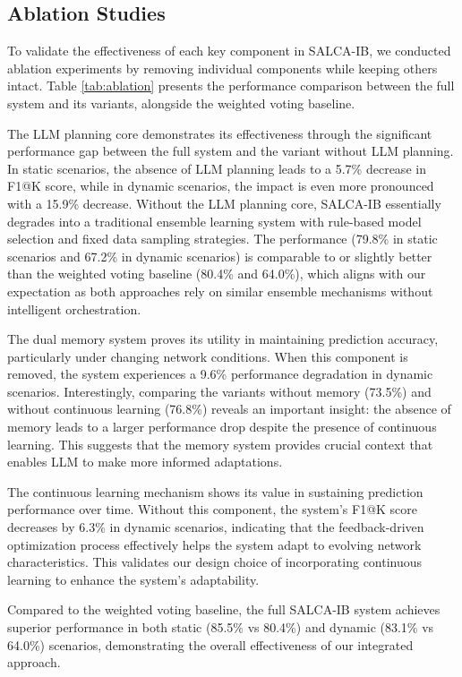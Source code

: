 \documentclass[conference]{IEEEtran}
\begin{document}
\subsection{Ablation Studies}
To validate the effectiveness of each key component in SALCA-IB, we conducted ablation experiments by removing individual components while keeping others intact. Table \ref{tab:ablation} presents the performance comparison between the full system and its variants, alongside the weighted voting baseline.

The LLM planning core demonstrates its effectiveness through the significant performance gap between the full system and the variant without LLM planning. In static scenarios, the absence of LLM planning leads to a 5.7\% decrease in F1@K score, while in dynamic scenarios, the impact is even more pronounced with a 15.9\% decrease. Without the LLM planning core, SALCA-IB essentially degrades into a traditional ensemble learning system with rule-based model selection and fixed data sampling strategies. The performance (79.8\% in static scenarios and 67.2\% in dynamic scenarios) is comparable to or slightly better than the weighted voting baseline (80.4\% and 64.0\%), which aligns with our expectation as both approaches rely on similar ensemble mechanisms without intelligent orchestration.

The dual memory system proves its utility in maintaining prediction accuracy, particularly under changing network conditions. When this component is removed, the system experiences a 9.6\% performance degradation in dynamic scenarios. Interestingly, comparing the variants without memory (73.5\%) and without continuous learning (76.8\%) reveals an important insight: the absence of memory leads to a larger performance drop despite the presence of continuous learning. This suggests that the memory system provides crucial context that enables LLM to make more informed adaptations.

The continuous learning mechanism shows its value in sustaining prediction performance over time. Without this component, the system's F1@K score decreases by 6.3\% in dynamic scenarios, indicating that the feedback-driven optimization process effectively helps the system adapt to evolving network characteristics. This validates our design choice of incorporating continuous learning to enhance the system's adaptability.

Compared to the weighted voting baseline, the full SALCA-IB system achieves superior performance in both static (85.5\% vs 80.4\%) and dynamic (83.1\% vs 64.0\%) scenarios, demonstrating the overall effectiveness of our integrated approach.
\end{document}
